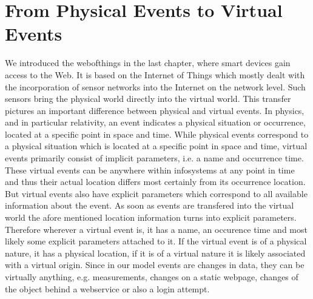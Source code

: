 \section{From Physical Events to Virtual Events}
We introduced the \textrm{\gls{webofthings}} in the last chapter, where smart devices gain access to the Web.
It is based on the \textrm{Internet of Things} which mostly dealt with the incorporation of sensor networks into the Internet on the network level.
Such sensors bring the physical world directly into the virtual world.
This transfer pictures an important difference between physical and virtual events.
In physics, and in particular relativity, an event indicates a physical situation or occurrence, located at a specific point in space and time.
While physical events correspond to a physical situation which is located at a specific point in space and time, virtual events primarily consist of implicit parameters, i.e. a name and occurrence time.
These virtual events can be anywhere within \textrm{\glspl{infosystem}} at any point in time and thus their actual location differs most certainly from its occurrence location.
But virtual events also have explicit parameters which correspond to all available information about the event.
As soon as events are transfered into the virtual world the afore mentioned location information turns into explicit parameters.
Therefore wherever a virtual event is, it has a name, an occurence time and most likely some explicit parameters attached to it.
If the virtual event is of a physical nature, it has a physical location, if it is of a virtual nature it is likely associated with a virtual origin.
Since in our model events are changes in data, they can be virtually anything, e.g. measurements, changes on a static webpage, changes of the object behind a \textrm{\gls{webservice}} or also a login attempt.


